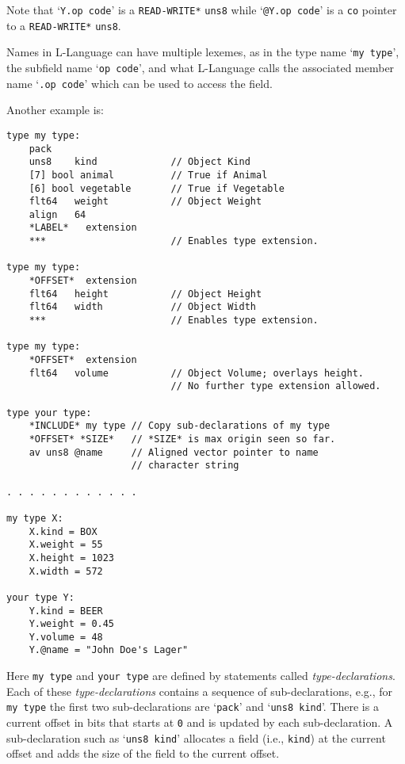 \documentclass[12pt]{article}
\newenvironment{indpar}[1][0.3in]%
	{\begin{list}{}%
		     {\setlength{\itemsep}{0in}%
		      \setlength{\topsep}{0in}%
		      \setlength{\parsep}{1ex}%
		      \setlength{\labelwidth}{#1}%
		      \setlength{\leftmargin}{#1}%
		      \addtolength{\leftmargin}{\labelsep}}%
	 \item}%
	{\end{list}}
\begin{document}
Note that `{\tt Y.op code}' is a {\tt *READ-WRITE*}
{\tt uns8} while `{\tt @Y.op code}' is a {\tt co} pointer to
a {\tt *READ-WRITE*} {\tt uns8}.

Names in L-Language can have multiple lexemes, as in
the type name `{\tt my type}', the subfield name `{\tt op code}',
and what L-Language calls the
associated member name `{\tt .op code}' which can be used to access
the field.

Another example is:

\begin{indpar}\begin{verbatim}
type my type:
    pack
    uns8    kind             // Object Kind
    [7] bool animal          // True if Animal
    [6] bool vegetable       // True if Vegetable
    flt64   weight           // Object Weight
    align   64
    *LABEL*   extension
    ***                      // Enables type extension.

type my type:
    *OFFSET*  extension
    flt64   height           // Object Height
    flt64   width            // Object Width
    ***                      // Enables type extension.

type my type:
    *OFFSET*  extension
    flt64   volume           // Object Volume; overlays height.
                             // No further type extension allowed.

type your type:
    *INCLUDE* my type // Copy sub-declarations of my type
    *OFFSET* *SIZE*   // *SIZE* is max origin seen so far.
    av uns8 @name     // Aligned vector pointer to name
                      // character string

. . . . . . . . . . . .

my type X:
    X.kind = BOX
    X.weight = 55
    X.height = 1023
    X.width = 572

your type Y:
    Y.kind = BEER
    Y.weight = 0.45
    Y.volume = 48
    Y.@name = "John Doe's Lager"
\end{verbatim}\end{indpar}

Here {\tt my type} and {\tt your type} are defined by
statements called {\em type-declarations}.  Each of these
{\em type-declarations} contains a sequence of sub-declarations, e.g.,
for {\tt my type} the first two sub-declarations are
`{\tt pack}' and `{\tt uns8 kind}'.  There is a current
offset in bits that starts at {\tt 0} and is updated by each sub-declaration.
A sub-declaration such as `{\tt uns8 kind}' allocates a field
(i.e., {\tt kind})
at the current offset and adds the size of the field to the
current offset.
\end{document}
